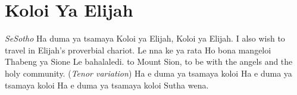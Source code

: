 \starttocol
\chapter{Koloi Ya Elijah}
\nexttocol
\hfill {\it SeSotho}
\stoptocol
\starttocol
\startlines
H{\sc a} duma ya tsamaya
Koloi ya Elijah,
Koloi ya Elijah.
\stoplines
\nexttocol
I also wish to travel in Elijah's proverbial chariot.
\stoptocol
\starttocol
\startlines
Le nna ke ya rata
Ho bona mangeloi
Thabeng ya Sione
Le bahalaledi.
\stoplines
\nexttocol
to Mount Sion, to be with the angels and the holy community.
\stoptocol
\starttocol
\startlines
\hfill   ({\it Tenor variation})\hfill
Ha e duma ya tsamaya koloi
Ha e duma ya tsamaya koloi
Ha e duma ya tsamaya koloi
Sutha wena.
\stoplines
\nexttocol
\stoptocol
